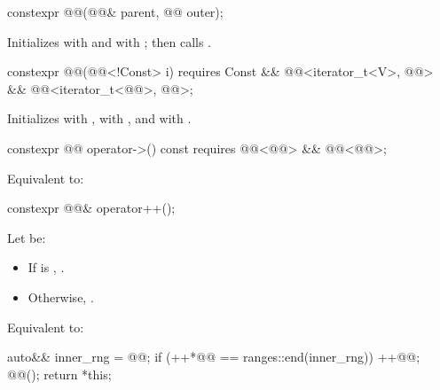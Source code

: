 %
\begin{itemdecl}
constexpr @@(@@& parent, @@ outer);
\end{itemdecl}

\begin{itemdescr}
\pnum
\effects
Initializes  with  and
 with ; then calls .
\end{itemdescr}

%
\begin{itemdecl}
constexpr @@(@@<!Const> i)
  requires Const &&
           @@<iterator_t<V>, @@> &&
           @@<iterator_t<@@>, @@>;
\end{itemdecl}

\begin{itemdescr}
\pnum
\effects
Initializes  with ,
 with , and
 with .
\end{itemdescr}

%
\begin{itemdecl}
constexpr @@ operator->() const
  requires @@<@@> && @@<@@>;
\end{itemdecl}

\begin{itemdescr}
\pnum
\effects
Equivalent to: 
\end{itemdescr}

%
\begin{itemdecl}
constexpr @@& operator++();
\end{itemdecl}

\begin{itemdescr}
\pnum
Let  be:
\begin{itemize}
\item If  is , .
\item Otherwise, .
\end{itemize}

\pnum
\effects
Equivalent to:
\begin{codeblock}
auto&& inner_rng = @@;
if (++*@@ == ranges::end(inner_rng)) {
  ++@@;
  @@();
}
return *this;
\end{codeblock}
\end{itemdescr}

